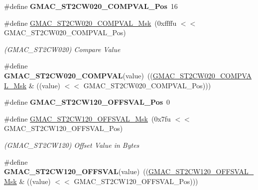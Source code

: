 \begin{DoxyCompactItemize}
\item 
\mbox{\label{group__SAMV71__GMAC_ga77fe4cefac592c747257bab5df887726}} 
\#define {\bfseries G\+M\+A\+C\+\_\+\+S\+T2\+C\+W020\+\_\+\+C\+O\+M\+P\+V\+A\+L\+\_\+\+Pos}~16
\item 
\mbox{\label{group__SAMV71__GMAC_gadb8b92108eead0ab8244f1a98f642ecd}} 
\#define \mbox{\hyperlink{group__SAMV71__GMAC_gadb8b92108eead0ab8244f1a98f642ecd}{G\+M\+A\+C\+\_\+\+S\+T2\+C\+W020\+\_\+\+C\+O\+M\+P\+V\+A\+L\+\_\+\+Msk}}~(0xffffu $<$$<$ G\+M\+A\+C\+\_\+\+S\+T2\+C\+W020\+\_\+\+C\+O\+M\+P\+V\+A\+L\+\_\+\+Pos)
\begin{DoxyCompactList}\small\item\em (G\+M\+A\+C\+\_\+\+S\+T2\+C\+W020) Compare Value \end{DoxyCompactList}\item 
\mbox{\label{group__SAMV71__GMAC_ga77d06d2c8f68fa0282b5a0cc0519d4b9}} 
\#define {\bfseries G\+M\+A\+C\+\_\+\+S\+T2\+C\+W020\+\_\+\+C\+O\+M\+P\+V\+AL}(value)~((\mbox{\hyperlink{group__SAMV71__GMAC_gadb8b92108eead0ab8244f1a98f642ecd}{G\+M\+A\+C\+\_\+\+S\+T2\+C\+W020\+\_\+\+C\+O\+M\+P\+V\+A\+L\+\_\+\+Msk}} \& ((value) $<$$<$ G\+M\+A\+C\+\_\+\+S\+T2\+C\+W020\+\_\+\+C\+O\+M\+P\+V\+A\+L\+\_\+\+Pos)))
\item 
\mbox{\label{group__SAMV71__GMAC_gac8188f27d6f98bf4cd3856cf26c38532}} 
\#define {\bfseries G\+M\+A\+C\+\_\+\+S\+T2\+C\+W120\+\_\+\+O\+F\+F\+S\+V\+A\+L\+\_\+\+Pos}~0
\item 
\mbox{\label{group__SAMV71__GMAC_ga9f78922480be91a1b5c14693baa792c9}} 
\#define \mbox{\hyperlink{group__SAMV71__GMAC_ga9f78922480be91a1b5c14693baa792c9}{G\+M\+A\+C\+\_\+\+S\+T2\+C\+W120\+\_\+\+O\+F\+F\+S\+V\+A\+L\+\_\+\+Msk}}~(0x7fu $<$$<$ G\+M\+A\+C\+\_\+\+S\+T2\+C\+W120\+\_\+\+O\+F\+F\+S\+V\+A\+L\+\_\+\+Pos)
\begin{DoxyCompactList}\small\item\em (G\+M\+A\+C\+\_\+\+S\+T2\+C\+W120) Offset Value in Bytes \end{DoxyCompactList}\item 
\mbox{\label{group__SAMV71__GMAC_ga7798195c153a0b6757218e66adcfe778}} 
\#define {\bfseries G\+M\+A\+C\+\_\+\+S\+T2\+C\+W120\+\_\+\+O\+F\+F\+S\+V\+AL}(value)~((\mbox{\hyperlink{group__SAMV71__GMAC_ga9f78922480be91a1b5c14693baa792c9}{G\+M\+A\+C\+\_\+\+S\+T2\+C\+W120\+\_\+\+O\+F\+F\+S\+V\+A\+L\+\_\+\+Msk}} \& ((value) $<$$<$ G\+M\+A\+C\+\_\+\+S\+T2\+C\+W120\+\_\+\+O\+F\+F\+S\+V\+A\+L\+\_\+\+Pos)))

\end{DoxyCompactItemize}
